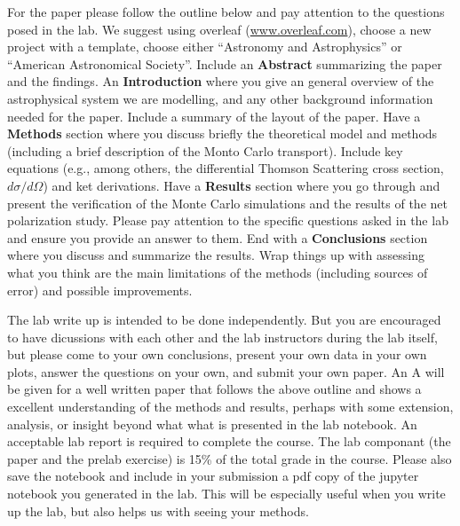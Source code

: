 \documentclass[12pt]{amsart}
\begin{document}
For the paper please follow the outline below and pay attention to the
questions posed in the lab.  We suggest using overleaf
(\url{www.overleaf.com}), choose a new project with a template, choose
either ``Astronomy and Astrophysics'' or ``American Astronomical
Society''. Include an {\bf{Abstract}} summarizing the paper and the
findings.  An {\bf{Introduction}} where you give an general overview
of the astrophysical system we are modelling, and any other background
information needed for the paper. Include a summary of the layout of
the paper. Have a {\bf{Methods}} section where you discuss briefly the
theoretical model and methods (including a brief description of the
Monto Carlo transport).  Include key equations (e.g., among others,
the differential Thomson Scattering cross section, $d\sigma/d\Omega$)
and ket derivations. Have a {\bf{Results}} section where you go through and
present the verification of the Monte Carlo simulations and the
results of the net polarization study. Please pay attention to the
specific questions asked in the lab and ensure you provide an answer
to them. End with a {\bf{Conclusions}} section where you discuss and
summarize the results. Wrap things up with assessing what you think
are the main limitations of the methods (including sources of error)
and possible improvements.
\newline

The lab write up is intended to be done independently. But you are
encouraged to have dicussions with each other and the lab instructors
during the lab itself, but please come to your own conclusions,
present your own data in your own plots, answer the questions on your
own, and submit your own paper. An A will be given for a well written
paper that follows the above outline and shows a excellent
understanding of the methods and results, perhaps with some extension,
analysis, or insight beyond what what is presented in the lab
notebook. An acceptable lab report is required to complete the course.
The lab componant (the paper and the prelab exercise) is 15\% of the
total grade in the course. Please also save the notebook and include
in your submission a pdf copy of the jupyter notebook you generated in
the lab.  This will be especially useful when you write up the lab,
but also helps us with seeing your methods.
\end{document}
